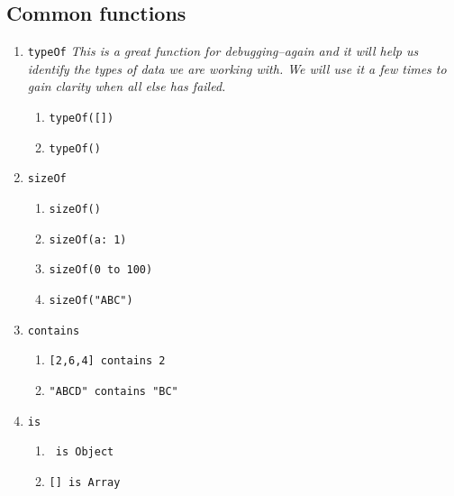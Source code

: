 \subsection{Common functions}
\begin{enumerate}[resume*]

\item \texttt{typeOf}
  \newline
  \emph{
    This is a great function for debugging--again and it will help us identify the types of
    data we are working with.  We will use it a few times to gain clarity when all else has
    failed.
  }
  \begin{enumerate}
    \item \texttt{typeOf([])}
    \item \texttt{typeOf({})}
  \end{enumerate}
  
\item \texttt{sizeOf}
  \begin{enumerate}
  \item \texttt{sizeOf({})}
  \item \texttt{sizeOf({a: 1})}
  \item \texttt{sizeOf(0 to 100)}
  \item \texttt{sizeOf("ABC")}
  \end{enumerate}

\item \texttt{contains}
  \begin{enumerate}
  \item \texttt{[2,6,4] contains 2}
  \item \texttt{"ABCD" contains "BC"}
  \end{enumerate}

\item \texttt{is}
  \begin{enumerate}
  \item \texttt{{} is Object}
  \item \texttt{[] is Array}  
  \end{enumerate}
\end{enumerate}

